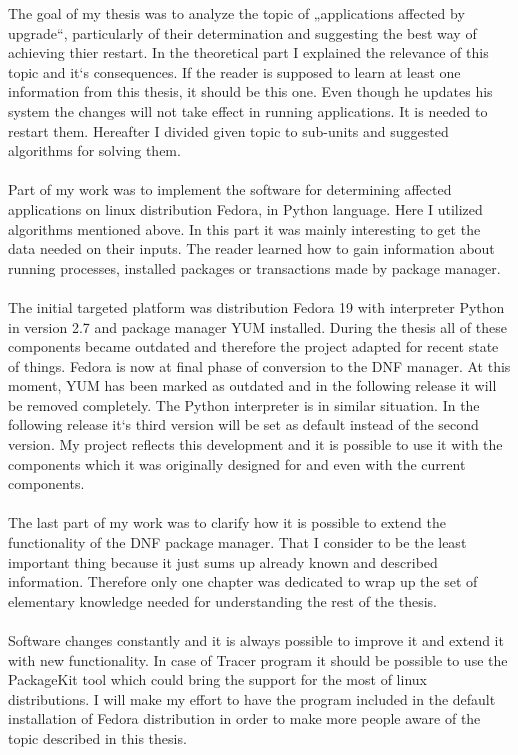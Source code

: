 \documentclass[
  field=inf,
  biblatex,
  glossaries,
  index
]{kidiplom}
\begin{document}
\begin{kiconclusions}[english]
	The goal of my thesis was to analyze the topic of „applications affected by upgrade“, particularly of their determination and suggesting the best way of achieving thier restart. In the theoretical part I explained the relevance of this topic and it‘s consequences. If the reader is supposed to learn at least one information from this thesis, it should be this one. Even though he updates his system the changes will not take effect in running applications. It is needed to restart them. Hereafter I divided given topic to sub-units and suggested algorithms for solving them.
	\\
	\\
Part of my work was to implement the software for determining affected applications on linux distribution Fedora, in Python language. Here I utilized algorithms mentioned above. In this part it was mainly interesting to get the data needed on their inputs. The reader learned how to gain information about running processes, installed packages or transactions made by package manager.
	\\
	\\
The initial targeted platform was distribution Fedora 19 with interpreter Python in version 2.7 and package manager YUM installed. During the thesis all of these components became outdated and therefore the project adapted for recent state of things. Fedora is now at final phase of conversion to the DNF manager. At this moment, YUM has been marked as outdated and in the following release it will be removed completely. The Python interpreter is in similar situation. In the following release it‘s third version will be set as default instead of the second version. My project reflects this development and it is possible to use it with the components which it was originally designed for and even with the current components.
	\\
	\\
The last part of my work was to clarify how it is possible to extend the functionality of the DNF package manager. That I consider to be the least important thing because it just sums up already known and described information. Therefore only one chapter was dedicated to wrap up the set of elementary knowledge needed for understanding the rest of the thesis.
	\\
	\\
Software changes constantly and it is always possible to improve it and extend it with new functionality. In case of Tracer program it should be possible to use the PackageKit tool which could bring the support for the most of linux distributions. I will make my effort to have the program included in the default installation of Fedora distribution in order to make more people aware of the topic described in this thesis.
\end{kiconclusions}
\end{document}
